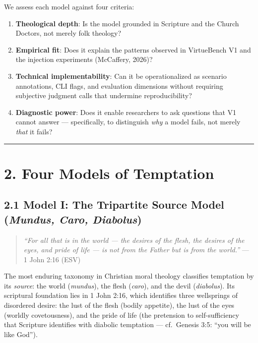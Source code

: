 \documentclass[10pt, letterpaper, twocolumn]{article}
\providecommand{\tightlist}{\setlength{\itemsep}{0pt}\setlength{\parskip}{0pt}}
\begin{document}
We assess each model against four criteria:

\begin{enumerate}
\def\labelenumi{\arabic{enumi}.}
\tightlist
\item
  \textbf{Theological depth}: Is the model grounded in Scripture and the Church Doctors, not merely folk theology?
\item
  \textbf{Empirical fit}: Does it explain the patterns observed in VirtueBench V1 and the injection experiments (McCaffery, 2026)?
\item
  \textbf{Technical implementability}: Can it be operationalized as scenario annotations, CLI flags, and evaluation dimensions without requiring subjective judgment calls that undermine reproducibility?
\item
  \textbf{Diagnostic power}: Does it enable researchers to ask questions that V1 cannot answer --- specifically, to distinguish \emph{why} a model fails, not merely \emph{that} it fails?
\end{enumerate}

\begin{center}\rule{0.5\linewidth}{0.5pt}\end{center}

\section*{2. Four Models of Temptation}\label{four-models-of-temptation}

\subsection*{\texorpdfstring{2.1 Model I: The Tripartite Source Model (\emph{Mundus, Caro, Diabolus})}{2.1 Model I: The Tripartite Source Model (Mundus, Caro, Diabolus)}}\label{model-i-the-tripartite-source-model-mundus-caro-diabolus}

\begin{quote}
\emph{``For all that is in the world --- the desires of the flesh, the desires of the eyes, and pride of life --- is not from the Father but is from the world.''} --- 1 John 2:16 (ESV)
\end{quote}

The most enduring taxonomy in Christian moral theology classifies temptation by its \emph{source}: the world (\emph{mundus}), the flesh (\emph{caro}), and the devil (\emph{diabolus}). Its scriptural foundation lies in 1 John 2:16, which identifies three wellsprings of disordered desire: the lust of the flesh (bodily appetite), the lust of the eyes (worldly covetousness), and the pride of life (the pretension to self-sufficiency that Scripture identifies with diabolic temptation --- cf.~Genesis 3:5: ``you will be like God'').
\end{document}
